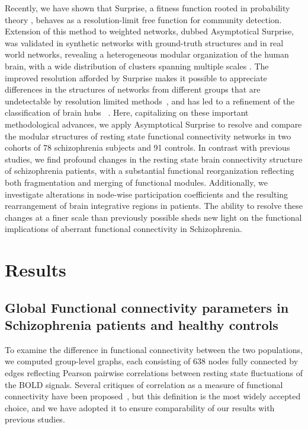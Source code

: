 Recently, we have shown that Surprise, a fitness function rooted in probability theory \cite{nicolini2016}, behaves as a resolution-limit free function for community detection.
Extension of this method to weighted networks, dubbed Asymptotical Surprise, was validated in synthetic networks with ground-truth structures and in real world networks, revealing a heterogeneous modular organization of the human brain, with a wide distribution of clusters spanning multiple scales \cite{nicolini2017}.
The improved resolution afforded by Surprise makes it possible to appreciate differences in the structures of networks from different groups that are undetectable by resolution limited methods~\cite{nicolini2016}, and has led to a refinement of the classification of brain hubs~ \cite{nicolini2017}.
Here, capitalizing on these important methodological advances, we apply Asymptotical Surprise to resolve and compare the modular structures of resting state functional connectivity networks in two cohorts of 78 schizophrenia subjects and 91 controls.
In contrast with previous studies, we find profound changes in the resting state brain connectivity structure of schizophrenia patients, with a substantial functional reorganization reflecting both fragmentation and merging of functional modules.
Additionally, we investigate alterations in node-wise participation coefficients and the resulting rearrangement of brain integrative regions in patients.
The ability to resolve these changes at a finer scale than previously possible sheds new light on the functional implications of aberrant functional connectivity in Schizophrenia.

\section{Results}
\subsection{Global Functional connectivity parameters in Schizophrenia patients and healthy controls}

To examine the difference in functional connectivity between the two populations, we computed group-level graphs, each consisting of 638 nodes fully connected by edges reflecting Pearson pairwise correlations between resting state fluctuations of the BOLD signals.
Several critiques of correlation as a measure of functional connectivity have been proposed~, but this definition is the most widely accepted choice, and we have adopted it to ensure comparability of our results with previous studies.

